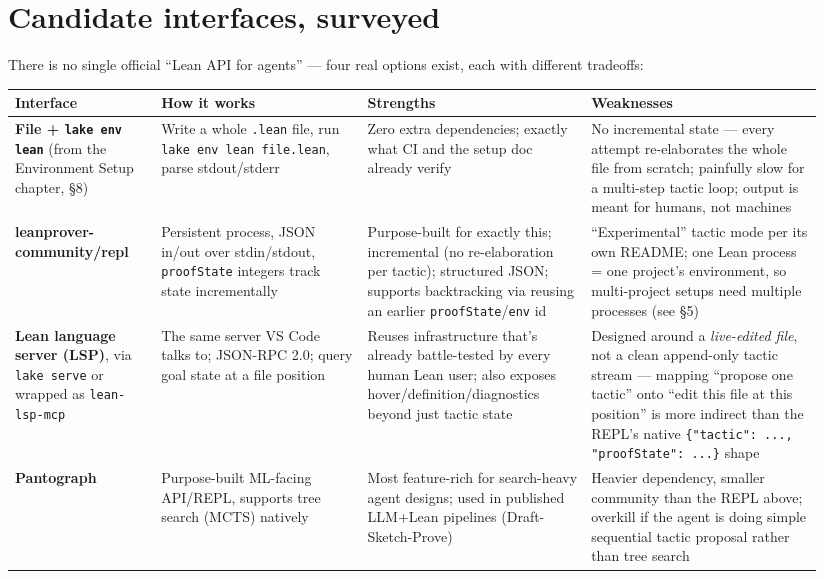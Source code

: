 \section{Candidate interfaces, surveyed}

There is no single official ``Lean API for agents'' --- four real options exist, each with different tradeoffs:

\begin{center}
\begin{tabular}{@{}p{0.17\linewidth}p{0.24\linewidth}p{0.26\linewidth}p{0.27\linewidth}@{}}
\hline
\textbf{Interface} & \textbf{How it works} & \textbf{Strengths} & \textbf{Weaknesses} \\
\hline
\textbf{File + \texttt{lake env lean}} (from the Environment Setup chapter, \S8) & Write a whole \texttt{.lean} file, run \texttt{lake env lean file.lean}, parse stdout/stderr & Zero extra dependencies; exactly what CI and the setup doc already verify & No incremental state --- every attempt re-elaborates the whole file from scratch; painfully slow for a multi-step tactic loop; output is meant for humans, not machines \\
\textbf{leanprover-community/repl} & Persistent process, JSON in/out over stdin/stdout, \texttt{proofState} integers track state incrementally & Purpose-built for exactly this; incremental (no re-elaboration per tactic); structured JSON; supports backtracking via reusing an earlier \texttt{proofState}/\texttt{env} id & ``Experimental'' tactic mode per its own README; one Lean process = one project's environment, so multi-project setups need multiple processes (see \S5) \\
\textbf{Lean language server (LSP)}, via \texttt{lake serve} or wrapped as \texttt{lean-lsp-mcp} & The same server VS Code talks to; JSON-RPC 2.0; query goal state at a file position & Reuses infrastructure that's already battle-tested by every human Lean user; also exposes hover/definition/diagnostics beyond just tactic state & Designed around a \emph{live-edited file}, not a clean append-only tactic stream --- mapping ``propose one tactic'' onto ``edit this file at this position'' is more indirect than the REPL's native \texttt{\{"tactic": ..., "proofState": ...\}} shape \\
\textbf{Pantograph} & Purpose-built ML-facing API/REPL, supports tree search (MCTS) natively & Most feature-rich for search-heavy agent designs; used in published LLM+Lean pipelines (Draft-Sketch-Prove) & Heavier dependency, smaller community than the REPL above; overkill if the agent is doing simple sequential tactic proposal rather than tree search \\
\hline
\end{tabular}
\end{center}

